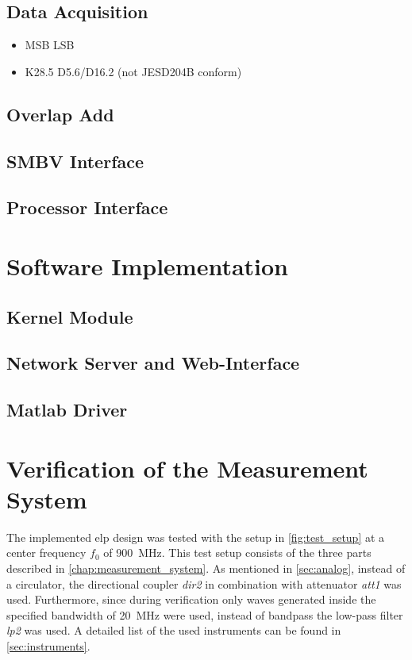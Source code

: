 \documentclass[12pt,a4paper,parskip=full,abstract=true,BCOR=10mm,twoside,open=right]{scrreprt}
\def\device#1{\textit{#1}}
\begin{document}
\section{Data Acquisition}
\label{sec:acquisition}
\begin{itemize}
    \item MSB \rightarrow LSB
    \item K28.5 D5.6/D16.2 (not JESD204B conform\cite{ltc2274}) \cite{jesd205B.01}
\end{itemize}
\section{Overlap Add}
\label{sec:overlap_add}
\section{SMBV Interface}
\label{sec:smbv_interface}
\section{Processor Interface}


\chapter{Software Implementation}
\label{chap:software}
\section{Kernel Module}
\section{Network Server and Web-Interface}
\section{Matlab Driver}
\label{sec:matlab}



\chapter{Verification of the Measurement System}
\label{chap:verification}

The implemented \gls{elp} design was tested with the setup in
\cref{fig:test_setup} at a center frequency $f_0$ of \SI{900}{\mega\hertz}. This test setup consists of the three parts
described in \cref{chap:measurement_system}. As mentioned in
\cref{sec:analog}, instead of a circulator, the directional coupler
\device{dir2} in combination with attenuator \device{att1} was used.
Furthermore, since during verification only waves generated inside
the specified bandwidth of \SI{20}{\mega\hertz} were used, instead of bandpass
the low-pass filter \device{lp2} was used. A detailed list of the used
instruments can be found in \cref{sec:instruments}.
\end{document}
